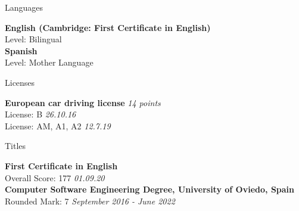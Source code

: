 \documentclass{resume} %
\begin{document}

\begin{rSection}{Languages}

{\bf English (Cambridge: First Certificate in English)} \\ 
Level: Bilingual \\

{\bf Spanish} \\
Level: Mother Language \\

\end{rSection}


\begin{rSection}{Licenses}

{\bf European car driving license} \hfill {\em 14 points}\\ 
License: B \hfill {\em 26.10.16} \\
License: AM, A1, A2 \hfill {\em 12.7.19} \\

\end{rSection}


\begin{rSection}{Titles}

{\bf First Certificate in English} \\ 
Overall Score: 177 \hfill {\em 01.09.20} \\

{\bf Computer Software Engineering Degree, University of Oviedo, Spain} \\
Rounded Mark: 7 \hfill {\em September 2016 - June 2022} \\ 

\end{rSection}

\end{document}
